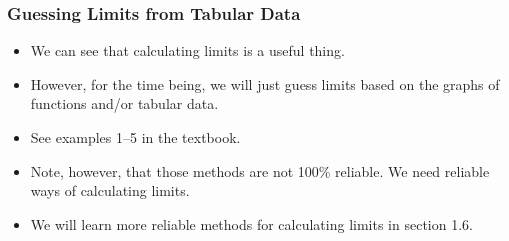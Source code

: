 \documentclass[serif,ignorenonframetext]{beamer}
\begin{document}
\begin{frame}
\begin{columns}
\begin{center}
  \end{center}
  \end{columns}
\end{frame}

\begin{frame}
  \frametitle{Guessing Limits from Tabular Data}
  \begin{itemize}
  \item We can see that calculating limits is a useful thing.
    \pause
  \item However, for the time being, we will just guess limits
    based on the graphs of functions and/or tabular data.
    \pause
  \item See examples 1--5 in the textbook.
    \pause
  \item Note, however, that those methods are not 100\% reliable.
    We need reliable ways of calculating limits.
    \pause
  \item We will learn more reliable methods for calculating limits
    in section 1.6.
  \end{itemize}
\end{frame}
\end{document}
